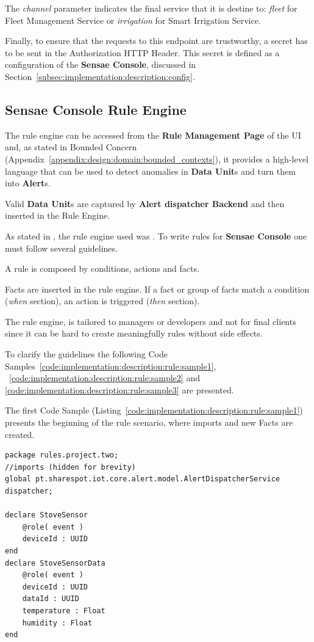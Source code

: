 The \textit{channel} parameter indicates the final service that it is destine to: \textit{fleet} for Fleet Management Service or \textit{irrigation} for Smart Irrigation Service.

Finally, to ensure that the requests to this endpoint are trustworthy, a secret has to be sent in the Authorization HTTP Header. This secret is defined as a configuration of the \textbf{Sensae Console}, discussed in Section~\ref{subsec:implementation:description:config}.

\subsection{Sensae Console Rule Engine}
\label{subsec:implementation:description:rule}

The rule engine can be accessed from the \textbf{Rule Management Page} of the UI and, as stated in  Bounded Concern (Appendix~\ref{appendix:design:domain:bounded_contexts}), it provides a high-level language that can be used to detect anomalies in \textbf{Data Unit}s and turn them into \textbf{Alert}s.

Valid \textbf{Data Unit}s are captured by \textbf{Alert dispatcher Backend} and then inserted in the Rule Engine.

As stated in , the rule engine used was . To write rules for \textbf{Sensae Console} one must follow several guidelines.

A  rule is composed by conditions, actions and facts.

Facts are inserted in the rule engine. If a fact or group of facts match a condition (\textit{when} section), an action is triggered (\textit{then} section).

The rule engine, is tailored to managers or developers and not for final clients since it can be hard to create meaningfully rules without side effects.

To clarify the guidelines the following Code Samples~\ref{code:implementation:description:rule:sample1}, ~\ref{code:implementation:description:rule:sample2} and \ref{code:implementation:description:rule:sample3} are presented.

The first Code Sample (Listing~\ref{code:implementation:description:rule:sample1}) presents the beginning of the rule scenario, where imports and new Facts are created.

\begin{lstlisting}[style=drools, caption=Rule Scenario Example - Part 1, label={code:implementation:description:rule:sample1}]
package rules.project.two;
//imports (hidden for brevity)
global pt.sharespot.iot.core.alert.model.AlertDispatcherService dispatcher;

declare StoveSensor
    @role( event )
    deviceId : UUID
end
declare StoveSensorData
    @role( event )
    deviceId : UUID
    dataId : UUID
    temperature : Float
    humidity : Float
end
\end{lstlisting}

